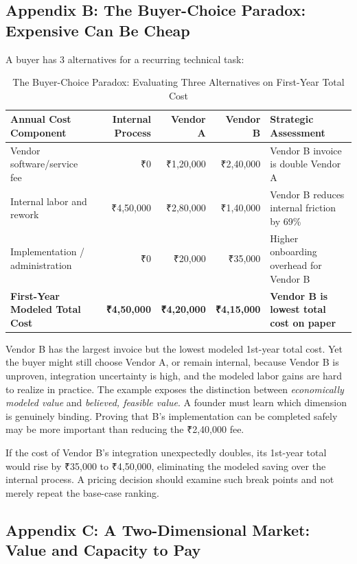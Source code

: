 \subsection*{Appendix B: The Buyer-Choice Paradox: Expensive Can Be Cheap}

A buyer has 3 alternatives for a recurring technical task:

\begin{table}[t]
\centering
\small
\caption{The Buyer-Choice Paradox: Evaluating Three Alternatives on First-Year Total Cost}
\begin{tabularx}{\textwidth}{p{}rrrX}
\toprule
\textbf{Annual Cost Component} & \textbf{Internal Process} & \textbf{Vendor A} & \textbf{Vendor B} & \textbf{Strategic Assessment} \\
\midrule
Vendor software/service fee & ₹0 & ₹1,20,000 & ₹2,40,000 & Vendor B invoice is double Vendor A \\
Internal labor and rework & ₹4,50,000 & ₹2,80,000 & ₹1,40,000 & Vendor B reduces internal friction by 69\% \\
Implementation / administration & ₹0 & ₹20,000 & ₹35,000 & Higher onboarding overhead for Vendor B \\
\midrule
\textbf{First-Year Modeled Total Cost} & \textbf{₹4,50,000} & \textbf{₹4,20,000} & \textbf{₹4,15,000} & \textbf{Vendor B is lowest total cost on paper} \\
\bottomrule
\end{tabularx}
\end{table}

Vendor B has the largest invoice but the lowest modeled 1st-year total cost. Yet the buyer might still choose Vendor A, or remain internal, because Vendor B is unproven, integration uncertainty is high, and the modeled labor gains are hard to realize in practice. The example exposes the distinction between \emph{economically modeled value} and \emph{believed, feasible value}. A founder must learn which dimension is genuinely binding. Proving that B's implementation can be completed safely may be more important than reducing the ₹2,40,000 fee.

If the cost of Vendor B's integration unexpectedly doubles, its 1st-year total would rise by ₹35,000 to ₹4,50,000, eliminating the modeled saving over the internal process. A pricing decision should examine such break points and not merely repeat the base-case ranking.

\subsection*{Appendix C: A Two-Dimensional Market: Value and Capacity to Pay}

